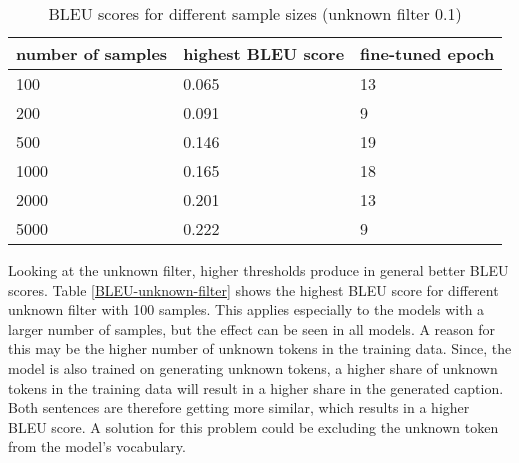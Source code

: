 \documentclass[11pt]{article}
\begin{document}
\begin{table}[h]
    \begin{center}
        \begin{tabular}{|p{2cm}|p{2cm}|p{2cm}|}
            \hline \bf number of samples & \bf highest BLEU score & \bf fine-tuned epoch \\ \hline
            100                          & 0.065                  & 13                   \\
            200                          & 0.091                  & 9                    \\
            500                          & 0.146                  & 19                   \\
            1000                         & 0.165                  & 18                   \\
            2000                         & 0.201                  & 13                   \\
            5000                         & 0.222                  & 9                    \\
            \hline
        \end{tabular}
    \end{center}
    \caption{\label{BLEU-sample-sizes} BLEU scores for different sample sizes (unknown filter 0.1) }
\end{table}

Looking at the unknown filter, higher thresholds produce in general better BLEU scores. Table \ref{BLEU-unknown-filter} shows the highest BLEU score for different unknown filter with 100 samples. This applies especially to the models with a larger number of samples, but the effect can be seen in all models. A reason for this may be the higher number of unknown tokens in the training data. Since, the model is also trained on generating unknown tokens, a higher share of unknown tokens in the training data will result in a higher share in the generated caption. Both sentences are therefore getting more similar, which results in a higher BLEU score. A solution for this problem could be excluding the unknown token from the model's vocabulary.
\end{document}
